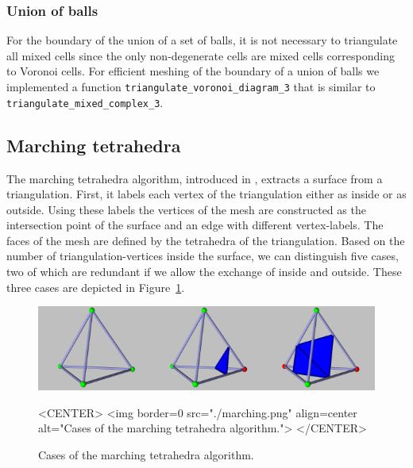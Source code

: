 \subsubsection{Union of balls}
For the boundary of the union of a set of balls, it is not necessary
to triangulate all mixed cells since the only non-degenerate cells are
mixed cells corresponding to Voronoi cells. For efficient meshing of
the boundary of a union of balls we implemented a function
\verb~triangulate_voronoi_diagram_3~ that is similar to
\verb~triangulate_mixed_complex_3~.



\subsection{Marching tetrahedra}
The marching tetrahedra algorithm, introduced in
\cite{cgal:tpg-rmtiise-99}, extracts a surface from a triangulation.
First, it labels each vertex of the triangulation either as inside or
as outside. Using these labels the vertices of the mesh are
constructed as the intersection point of the surface and an edge with
different vertex-labels. The faces of the mesh are defined by the
tetrahedra of the triangulation. Based on the number of
triangulation-vertices inside the surface, we can distinguish five
cases, two of which are redundant if we allow the exchange of inside
and outside. These three cases are depicted in
Figure~\ref{SkinSurface3-fig-marching}.

\begin{figure}
\begin{ccTexOnly}
\begin{center}
\includegraphics{Skin_surface_3/marching}
\end{center}
\end{ccTexOnly}
\caption{Cases of the marching tetrahedra algorithm.
\label{SkinSurface3-fig-marching}}
\begin{ccHtmlOnly}
<CENTER>
<img border=0 src="./marching.png" align=center
alt="Cases of the marching tetrahedra algorithm.">
</CENTER>
\end{ccHtmlOnly}
\end{figure}

